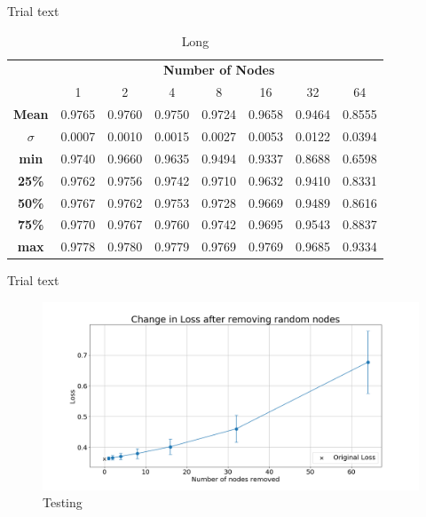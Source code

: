 \documentclass[UKenglish]{ifimaster}
\begin{document}
            Trial text

            \begin{table}[h!]
                \centering
                \begin{tabular}{c | c c c c c c c}
                    & \multicolumn{7}{c}{\textbf{Number of Nodes}} \\
                    \cline{2-8}
                    & 1 & 2 & 4 & 8 & 16 & 32 & 64 \\
                    \hline
                    \textbf{Mean} & 0.9765 & 0.9760 & 0.9750 & 0.9724 & 0.9658 & 0.9464 & 0.8555 \\
                    \textbf{$\sigma$} & 0.0007 & 0.0010 & 0.0015 & 0.0027 & 0.0053 & 0.0122 & 0.0394 \\
                    \textbf{min} & 0.9740 & 0.9660 & 0.9635 & 0.9494 & 0.9337 & 0.8688 & 0.6598 \\
                    \textbf{25\%} & 0.9762 & 0.9756 & 0.9742 & 0.9710 & 0.9632 & 0.9410 & 0.8331 \\
                    \textbf{50\%} & 0.9767 & 0.9762 & 0.9753 & 0.9728 & 0.9669 & 0.9489 & 0.8616 \\
                    \textbf{75\%} & 0.9770 & 0.9767 & 0.9760 & 0.9742 & 0.9695 & 0.9543 & 0.8837 \\
                    \textbf{max} & 0.9778 & 0.9780 & 0.9779 & 0.9769 & 0.9769 & 0.9685 & 0.9334 \\
                    
                \end{tabular}
                \caption[Short]{Long}
            \end{table}

            Trial text

            \begin{figure}[h!]\centering
                \includegraphics[width=\textwidth]{Loss_change_random_removal_fmnist.png}
                \caption[Short title]{Testing}
                \label{fig:loss_rn_fmnist}
            \end{figure}
\end{document}
